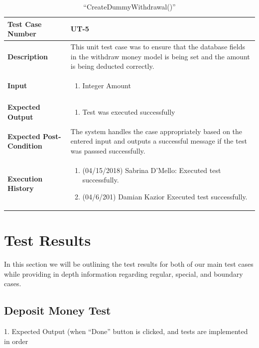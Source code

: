 \documentclass[12pt]{article}
\begin{document}
\begin{table}[H]
\caption{“CreateDummyWithdrawal()”}
\begin{center}
\begin{tabular}{|p{5.5cm}|p{11cm}|}
  \hline
  \bf Test Case Number & UT-5	\\\hline
  \bf Description & 
This unit test case was to ensure that the database fields in the withdraw money model is being set and the amount is being deducted correctly.\\\hline
  \bf Input &
  \begin{enumerate}
  \item Integer Amount
  \end{enumerate}
  \\\hline
  \bf Expected Output &
  \begin{enumerate}
  \item Test was executed successfully
  \end{enumerate}
  \\\hline
  \bf Expected Post-Condition & 
  The system handles the case appropriately based on the entered input and outputs a successful message if the test was passsed successfully.
  \\\hline   
  \bf Execution History & 
  \begin{enumerate}
  \item (04/15/2018) Sabrina D’Mello: Executed test successfully.
  \item (04/6/201) Damian Kazior Executed test successfully.
  \end{enumerate}
  \\\hline
\end{tabular}
\end{center}
\end{table}

\section{Test Results}

In this section we will be outlining the test results for both of our main test cases while providing in depth information regarding regular, special, and boundary cases. 

\subsection{Deposit Money Test}

1. Expected Output (when ``Done'' button is clicked, and tests are implemented in order\\
\end{document}
